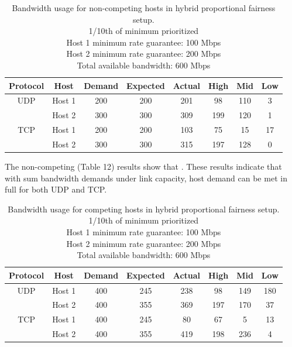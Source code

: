 \documentclass[accepted,single]{gipaper}
\begin{document}
\begin{table}[h]
	\label{hybr_nc}
	\vspace{-2mm}
	\begin{center}
		\begin{small}
		\setlength\tabcolsep{1.5pt}
			\begin{tabular}{cccccccc}
				Protocol & Host & Demand & Expected & Actual & High & Mid & Low\\
				\hline
				UDP & Host 1 & 200 & 200 & 201 & 98 & 110 & 3\\
				    & Host 2 & 300 & 300 & 309 & 199 & 120 & 1\\
				\hline
				TCP & Host 1 & 200 & 200 & 103 & 75 & 15 & 17\\
				    & Host 2 & 300 & 300 & 315 & 197 & 128 & 0\\
			\end{tabular}
		\end{small}
	\end{center}
	\caption{Bandwidth usage for non-competing hosts in hybrid proportional fairness setup.\\
	1/10th of minimum prioritized\\	
	Host 1 minimum rate guarantee: 100 Mbps\\
	Host 2 minimum rate guarantee: 200 Mbps\\	
	Total available bandwidth: 600 Mbps}
	\vspace{-3mm}
\end{table}

The non-competing (Table 12) results show that . These results indicate that with sum bandwidth demands under link capacity, host demand can be met in full for both UDP and TCP.

\begin{table}[h]
	\label{hybr_c}
	\vspace{-2mm}
	\begin{center}
		\begin{small}
		\setlength\tabcolsep{1.5pt}
			\begin{tabular}{cccccccc}
				Protocol & Host & Demand & Expected & Actual & High & Mid & Low\\
				\hline
				UDP & Host 1 & 400 & 245 & 238 & 98 & 149 & 180\\
				    & Host 2 & 400 & 355 & 369 & 197 & 170 & 37\\
				\hline
				TCP & Host 1 & 400 & 245 & 80 & 67 & 5 & 13\\
				    & Host 2 & 400 & 355 & 419 & 198 & 236 & 4\\
			\end{tabular}
		\end{small}
	\end{center}
	\caption{Bandwidth usage for competing hosts in hybrid proportional fairness setup.\\
	1/10th of minimum prioritized\\
	Host 1 minimum rate guarantee: 100 Mbps\\
	Host 2 minimum rate guarantee: 200 Mbps\\	
	Total available bandwidth: 600 Mbps}
	\vspace{-3mm}
\end{table}
\end{document}
